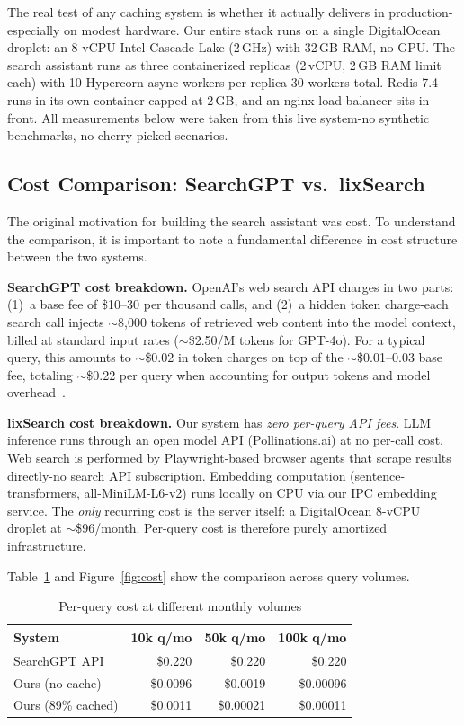 \documentclass[conference]{IEEEtran}
\begin{document}
The real test of any caching system is whether it actually delivers in production-especially on modest hardware. Our entire stack runs on a single DigitalOcean droplet: an 8-vCPU Intel Cascade Lake (2\,GHz) with 32\,GB RAM, no GPU. The search assistant runs as three containerized replicas (2\,vCPU, 2\,GB RAM limit each) with 10 Hypercorn async workers per replica-30 workers total. Redis 7.4 runs in its own container capped at 2\,GB, and an nginx load balancer sits in front. All measurements below were taken from this live system-no synthetic benchmarks, no cherry-picked scenarios.

\subsection{Cost Comparison: SearchGPT vs.\ lixSearch}

The original motivation for building the search assistant was cost. To understand the comparison, it is important to note a fundamental difference in cost structure between the two systems.

\textbf{SearchGPT cost breakdown.} OpenAI's web search API charges in two parts: (1)~a base fee of \$10--30 per thousand calls, and (2)~a hidden token charge-each search call injects ${\sim}$8{,}000 tokens of retrieved web content into the model context, billed at standard input rates (${\sim}$\$2.50/M tokens for GPT-4o). For a typical query, this amounts to ${\sim}$\$0.02 in token charges on top of the ${\sim}$\$0.01--0.03 base fee, totaling ${\sim}$\$0.22 per query when accounting for output tokens and model overhead~\cite{openai_search_pricing, openai_search_billing}.

\textbf{lixSearch cost breakdown.} Our system has \emph{zero per-query API fees}. LLM inference runs through an open model API (Pollinations.ai) at no per-call cost. Web search is performed by Playwright-based browser agents that scrape results directly-no search API subscription. Embedding computation (sentence-transformers, all-MiniLM-L6-v2) runs locally on CPU via our IPC embedding service. The \emph{only} recurring cost is the server itself: a DigitalOcean 8-vCPU droplet at ${\sim}$\$96/month. Per-query cost is therefore purely amortized infrastructure.

Table~\ref{tab:cost} and Figure~\ref{fig:cost} show the comparison across query volumes.

\begin{table}[h]
\centering
\caption{Per-query cost at different monthly volumes}
\label{tab:cost}
{\small
\begin{tabular}{@{}lrrr@{}}
\toprule
\textbf{System} & \textbf{10k q/mo} & \textbf{50k q/mo} & \textbf{100k q/mo} \\
\midrule
SearchGPT API & \$0.220 & \$0.220 & \$0.220 \\
Ours (no cache) & \$0.0096 & \$0.0019 & \$0.00096 \\
Ours (89\% cached) & \$0.0011 & \$0.00021 & \$0.00011 \\
\bottomrule
\end{tabular}}
\end{table}
\end{document}
